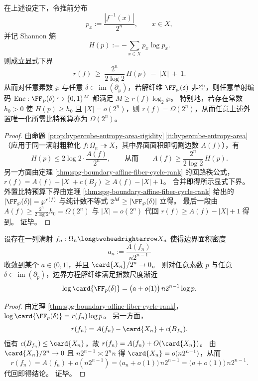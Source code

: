 \begin{corollary}[推前熵的非退化性强迫回路秩的指数下界]\label{cor:spg-boundary-cycle-rank-from-entropy}
在上述设定下，令推前分布
\[
p_x:=\frac{|f^{-1}(x)|}{2^n},\qquad x\in X,
\]
并记 Shannon 熵
\[
H(p):=-\sum_{x\in X}p_x\log p_x.
\]
则成立显式下界
\[
\boxed{\;
r(f)\ \ge\ \frac{2^n}{2\log 2}\,H(p)\ -\ |X|\ +\ 1.\;}
\]
从而对任意素数 \(\wp\) 与任意 \(\delta\in \operatorname{im}(\partial_{\wp})\)，若解纤维 \(\FF_{\wp}(\delta)\) 非空，则任意单射编码
\(
\mathrm{Enc}:\FF_{\wp}(\delta)\hookrightarrow\{0,1\}^M
\)
都满足 \(M\ge r(f)\log_2 \wp\)。
特别地，若存在常数 \(h_0>0\) 使 \(H(p)\ge h_0\) 且 \(|X|=o(2^n)\)，则 \(r(f)=\Omega(2^n)\)，从而任意上述外置唯一化所需比特预算亦为 \(\Omega(2^n)\)。
\end{corollary}
\begin{proof}
由命题 \ref{prop:hypercube-entropy-area-rigidity}\,\ref{it:hypercube-entropy-area}（应用于同一满射粗粒化 \(f:\Omega_n\twoheadrightarrow X\)，其中界面面积即切割边数 \(A(f)\)），有
\[
H(p)\le 2\log 2\cdot \frac{A(f)}{2^n},
\qquad\text{从而}\qquad
A(f)\ge \frac{2^n}{2\log 2}\,H(p).
\]
另一方面由定理 \ref{thm:spg-boundary-affine-fiber-cycle-rank} 的回路秩公式，
\(
r(f)=A(f)-|X|+c(B_f)\ge A(f)-|X|+1
\)。
合并即得所示显式下界。
外置比特预算下界由定理 \ref{thm:spg-boundary-affine-fiber-cycle-rank} 给出的 \(|\FF_{\wp}(\delta)|=\wp^{r(f)}\) 与纯计数不等式 \(2^M\ge |\FF_{\wp}(\delta)|\) 立得。
最后一段由 \(A(f)\ge \frac{2^n}{2\log 2}h_0=\Omega(2^n)\) 与 \(|X|=o(2^n)\) 代回 \(r(f)\ge A(f)-|X|+1\) 得到。
证毕。
\end{proof}





\begin{theorem}[面积密度非退化下的指数剩余自由度]\label{thm:spg-boundary-exponential-residual-dof}
设存在一列满射 \(f_n:\Omega_n\longtwoheadrightarrow X_n\) 使得边界面积密度
\[
a_n:=\frac{A(f_n)}{n2^{n-1}}
\]
收敛到某个 \(a\in(0,1]\)，并且 \(\card{X_n}/2^n\to 0\)。
则对任意素数 \(p\) 与任意 \(\delta\in\operatorname{im}(\partial_p)\)，边界方程解纤维满足指数尺度渐近
\[
\log\card{\FF_p(\delta)}
=\bigl(a+o(1)\bigr)\,n2^{n-1}\log p.
\]
\end{theorem}
\begin{proof}
由定理 \ref{thm:spg-boundary-affine-fiber-cycle-rank}，
\(
\log\card{\FF_p(\delta)}=r(f_n)\log p
\)。
另一方面，
\[
r(f_n)=A(f_n)-\card{X_n}+c(B_{f_n}).
\]
恒有 \(c(B_{f_n})\le \card{X_n}\)，故 \(r(f_n)=A(f_n)+O(\card{X_n})\)。
由 \(\card{X_n}/2^n\to 0\) 且 \(n2^{n-1}\asymp 2^n n\) 得 \(\card{X_n}=o(n2^{n-1})\)，从而
\[
r(f_n)=A(f_n)+o(n2^{n-1})=\bigl(a_n+o(1)\bigr)\,n2^{n-1}=\bigl(a+o(1)\bigr)\,n2^{n-1}.
\]
代回即得结论。
证毕。
\end{proof}

